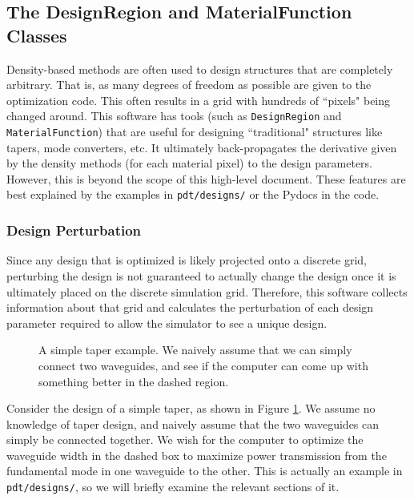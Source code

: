 \documentclass[12pt]{article}
\begin{document}
\subsection{The DesignRegion and MaterialFunction Classes}

Density-based methods are often used to design structures that are completely arbitrary. That is, as many degrees of freedom as possible are given to the optimization code. This often results in a grid with hundreds of ``pixels" being changed around. This software has tools (such as \texttt{DesignRegion} and \texttt{MaterialFunction}) that are useful for designing ``traditional" structures like tapers, mode converters, etc. It ultimately back-propagates the derivative given by the density methods (for each material pixel) to the design parameters. However, this is beyond the scope of this high-level document. These features are best explained by the examples in \texttt{pdt/designs/} or the Pydocs in the code.

\subsubsection{Design Perturbation}
Since any design that is optimized is likely projected onto a discrete grid, perturbing the design is not guaranteed to actually change the design once it is ultimately placed on the discrete simulation grid. Therefore, this software collects information about that grid and calculates the perturbation of each design parameter required to allow the simulator to see a unique design.

\begin{figure}
\caption{A simple taper example. We naively assume that we can simply connect two waveguides, and see if the computer can come up with something better in the dashed region.}
\label{fig.toy_taper_example}
\end{figure}

Consider the design of a simple taper, as shown in Figure \ref{fig.toy_taper_example}. We assume no knowledge of taper design, and naively assume that the two waveguides can simply be connected together. We wish for the computer to optimize the waveguide width in the dashed box to maximize power transmission from the fundamental mode in one waveguide to the other. This is actually an example in \texttt{pdt/designs/}, so we will briefly examine the relevant sections of it. 
\end{document}
